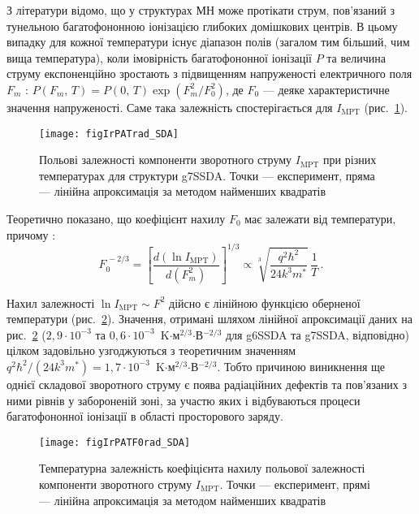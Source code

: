 З літератури \cite{Bulyarskii2001r,Evstropov,Ganichev:2000} відомо, що у структурах МН може протікати струм,
пов’язаний з тунельною багатофононною іонізацією глибоких домішкових центрів.
В цьому випадку для кожної температури існує діапазон полів (загалом тим більший, чим вища температура), коли імовірність багатофононної іонізації $P$
та величина струму експоненційно зростають з підвищенням напруженості електричного поля $F_m$ \cite{Bulyarskii2001r,Ganichev1997,Ganichev:2000}:
$P(F_m,\,T)=P(0,\,T) \exp(F_m^2/F_0^2)$,
де $F_0$ --- деяке характеристичне значення напруженості.
Саме така залежність спостерігається для $I_\mathrm{MPT}$ (рис.~\ref{figIrPATrad_SDA}).


\begin{figure}
\center
\texttt{[image: figIrPATrad\_SDA]}
\caption{\label{figIrPATrad_SDA}
Польові залежності компоненти зворотного струму $I_\mathrm{MPT}$ при різних температурах для структури g7SSDA.
Точки --- експеримент, пряма --- лінійна апроксимація за методом найменших квадратів
}%
\end{figure}

Теоретично показано, що коефіцієнт нахилу $F_0$ має залежати від температури, причому \cite{Bulyarskii2001r,Ganichev1997,Ganichev:2000}:
\begin{equation}\label{eqPAT}
    F_0^{\,-2/3}=\left[\frac{d(\ln I_\mathrm{MPT})}{d(F_m^2)}\right]^{1/3}\propto \sqrt[3]{\frac{q^2\hbar^2}{24k^3m^*}}\,\frac{1}{T}\,.
\end{equation}

Нахил залежності $\ln I_\mathrm{MPT}\sim F^2$ дійсно є лінійною функцією оберненої температури (рис.~\ref{figIrPATF0rad_SDA}).
Значення, отримані шляхом лінійної апроксимації даних на рис.~\ref{figIrPATF0rad_SDA}
($2,9\cdot10^{-3}$ та $0,6\cdot10^{-3}$~K$\cdot$м$^{2/3}$$\cdot$В$^{-2/3}$ для g6SSDA та g7SSDA, відповідно)
цілком задовільно узгоджуються з теоретичним значенням
$q^2\hbar^2/(24k^3m^*)=1,7\cdot10^{-3}$~K$\cdot$м$^{2/3}$$\cdot$В$^{-2/3}$.
Тобто причиною виникнення ще однієї складової зворотного струму є поява радіаційних дефектів та пов’язаних з ними рівнів у забороненій зоні,
за участю яких і відбуваються процеси багатофононної іонізації в області просторового заряду.



\begin{figure}
\center
\texttt{[image: figIrPATF0rad\_SDA]}
\caption{\label{figIrPATF0rad_SDA}
Температурна залежність коефіцієнта нахилу польової залежності компоненти зворотного струму $I_\mathrm{MPT}$.
Точки --- експеримент, прямі --- лінійна апроксимація за методом найменших квадратів
}%
\end{figure}

